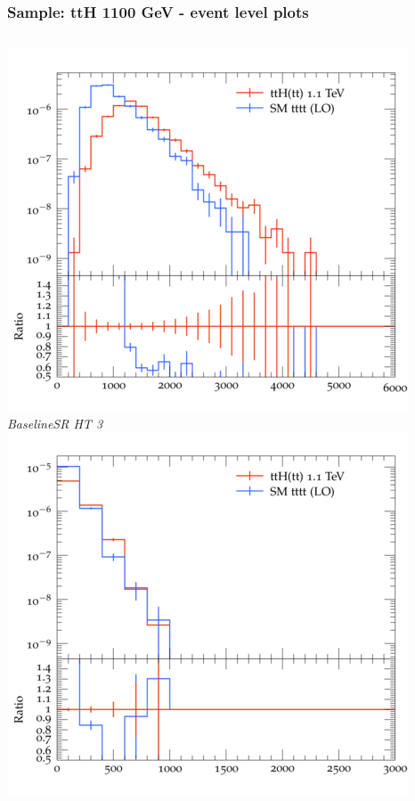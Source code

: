 \documentclass{beamer}
\begin{document}
\begin{frame}
\frametitle{Sample: ttH 1100 GeV - event level plots}
\begin{columns}
\includegraphics[width=\textwidth]{../plots/ttH_1100/tttt_ttH_1LOS/BaselineSR_HT_3.png}\\
\textit{\small BaselineSR HT 3}
\includegraphics[width=\textwidth]{../plots/ttH_1100/tttt_ttH_1LOS/BaselineSR_MET.png}\\

\end{columns}
\end{frame}
\end{document}
